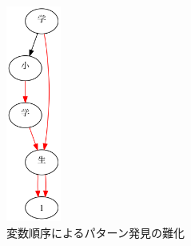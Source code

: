 \documentclass[12pt,twoside, fleqn]{ujbook}
\begin{document}
	\begin{figure}[htbp]
	\begin{center}
		\includegraphics [clip, width=1.8cm]{./img/seqbdd_no_sort.png}
		\caption{変数順序によるパターン発見の難化}
		\label{fig:seq_str_miss}
	\end{center}
	\end{figure}
\end{document}

